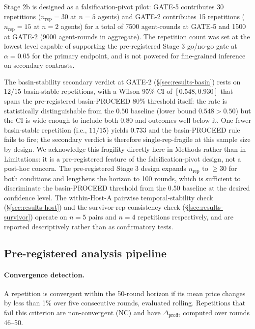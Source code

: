 Stage 2b is designed as a falsification-pivot pilot: GATE-5 contributes 30 repetitions ($n_{\text{rep}} = 30$ at $n = 5$ agents) and GATE-2 contributes 15 repetitions ($n_{\text{rep}} = 15$ at $n = 2$ agents) for a total of 7500 agent-rounds at GATE-5 and 1500 at GATE-2 (9000 agent-rounds in aggregate). The repetition count was set at the lowest level capable of supporting the pre-registered Stage 3 go/no-go gate at $\alpha = 0.05$ for the primary endpoint, and is not powered for fine-grained inference on secondary contrasts.

The basin-stability secondary verdict at GATE-2 (\S\ref{sec:results-basin}) rests on $12/15$ basin-stable repetitions, with a Wilson 95\% CI of $[0.548, 0.930]$ that spans the pre-registered basin-PROCEED 80\% threshold itself: the rate is statistically distinguishable from the $0.50$ baseline (lower bound $0.548 > 0.50$) but the CI is wide enough to include both $0.80$ and outcomes well below it. One fewer basin-stable repetition (i.e., $11/15$) yields $0.733$ and the basin-PROCEED rule fails to fire; the secondary verdict is therefore single-rep-fragile at this sample size by design. We acknowledge this fragility directly here in Methods rather than in Limitations: it is a pre-registered feature of the falsification-pivot design, not a post-hoc concern. The pre-registered Stage 3 design expands $n_{\text{rep}}$ to $\geq 30$ for both conditions and lengthens the horizon to 100 rounds, which is sufficient to discriminate the basin-PROCEED threshold from the 0.50 baseline at the desired confidence level. The within-Host-A pairwise temporal-stability check (\S\ref{sec:results-host}) and the survivor-rep consistency check (\S\ref{sec:results-survivor}) operate on $n = 5$ pairs and $n = 4$ repetitions respectively, and are reported descriptively rather than as confirmatory tests.

\subsection{Pre-registered analysis pipeline}
\label{sec:methods-pipeline}

\paragraph{Convergence detection.}
A repetition is convergent within the 50-round horizon if its mean price changes by less than 1\% over five consecutive rounds, evaluated rolling. Repetitions that fail this criterion are non-convergent (NC) and have $\Delta_{\text{profit}}$ computed over rounds 46--50.

